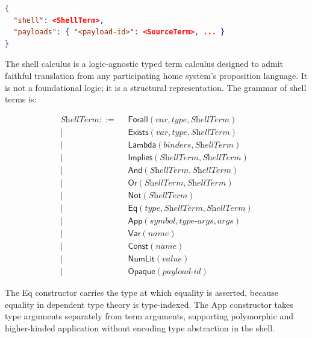 \documentclass[11pt,letterpaper]{article}
\theoremstyle{definition}
\theoremstyle{remark}
\begin{document}
\begin{lstlisting}[language=json]
{
  "shell": <ShellTerm>,
  "payloads": { "<payload-id>": <SourceTerm>, ... }
}
\end{lstlisting}

The shell calculus is a logic-agnostic typed term calculus designed to
admit faithful translation from any participating home system's
proposition language. It is not a foundational logic; it is a structural
representation. The grammar of shell terms is:

\begin{align*}
\textit{ShellTerm} ::= \;\;& \textsf{Forall}(\textit{var}, \textit{type}, \textit{ShellTerm}) \\
                       \mid \;& \textsf{Exists}(\textit{var}, \textit{type}, \textit{ShellTerm}) \\
                       \mid \;& \textsf{Lambda}(\textit{binders}, \textit{ShellTerm}) \\
                       \mid \;& \textsf{Implies}(\textit{ShellTerm}, \textit{ShellTerm}) \\
                       \mid \;& \textsf{And}(\textit{ShellTerm}, \textit{ShellTerm}) \\
                       \mid \;& \textsf{Or}(\textit{ShellTerm}, \textit{ShellTerm}) \\
                       \mid \;& \textsf{Not}(\textit{ShellTerm}) \\
                       \mid \;& \textsf{Eq}(\textit{type}, \textit{ShellTerm}, \textit{ShellTerm}) \\
                       \mid \;& \textsf{App}(\textit{symbol}, \textit{type-args}, \textit{args}) \\
                       \mid \;& \textsf{Var}(\textit{name}) \\
                       \mid \;& \textsf{Const}(\textit{name}) \\
                       \mid \;& \textsf{NumLit}(\textit{value}) \\
                       \mid \;& \textsf{Opaque}(\textit{payload-id})
\end{align*}

The \textsf{Eq} constructor carries the type at which equality is
asserted, because equality in dependent type theory is type-indexed.
The \textsf{App} constructor takes type arguments separately from term
arguments, supporting polymorphic and higher-kinded application without
encoding type abstraction in the shell.
\end{document}
